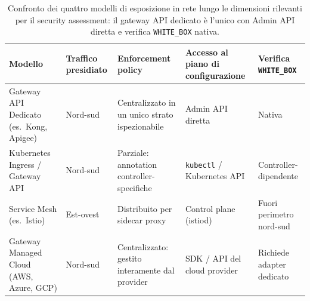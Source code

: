 \begin{table}[ht]
  \centering \small
  \begin{tabularx}{\textwidth}{@{} p{3.0cm} p{1.8cm} X X X @{}}
    \toprule
    \textbf{Modello}
     & \textbf{Traffico presidiato}
     & \textbf{Enforcement policy}
     & \textbf{Accesso al piano di configurazione}
     & \textbf{Verifica \texttt{WHITE\_BOX}}           \\
    \midrule
    Gateway \gls{API} Dedicato (es.\ Kong, Apigee)
     & Nord-sud
     & Centralizzato in un unico strato ispezionabile
     & Admin \gls{API} diretta
     & Nativa                                          \\
    \addlinespace
    Kubernetes Ingress / Gateway \gls{API}
     & Nord-sud
     & Parziale: annotation controller-specifiche
     & \texttt{kubectl} / Kubernetes \gls{API}
     & Controller-dipendente                           \\
    \addlinespace
    Service Mesh (es.\ Istio)
     & Est-ovest
     & Distribuito per sidecar proxy
     & Control plane (istiod)
     & Fuori perimetro nord-sud                        \\
    \addlinespace
    Gateway Managed Cloud (AWS, Azure, GCP)
     & Nord-sud
     & Centralizzato: gestito interamente dal provider
     & \gls{SDK} / \gls{API} del cloud provider
     & Richiede adapter dedicato                       \\
    \bottomrule
  \end{tabularx}
  \caption{Confronto dei quattro modelli di esposizione in rete lungo le dimensioni rilevanti per il security assessment: il gateway \gls{API} dedicato è l'unico con Admin \gls{API} diretta e verifica \texttt{WHITE\_BOX} nativa.}
  \label{tab:modelli-esposizione}
\end{table}
